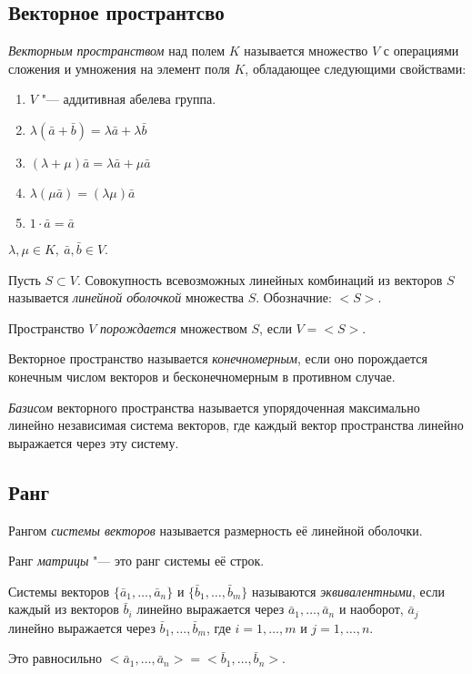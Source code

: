 \subsection*{Векторное пространтсво}

\begin{definition}
    \textit{Векторным пространством} над полем $K$ называется множество $V$ с операциями сложения и умножения на элемент поля $K$, обладающее следующими свойствами:
    \begin{enumerate}
        \item $V$ "--- аддитивная абелева группа.
    \item $\lambda(\bar{a} + \bar{b}) = \lambda \bar{a} + \lambda \bar{b}$
        \item $(\lambda + \mu)\bar{a} = \lambda \bar{a} + \mu \bar{a}$
        \item $\lambda(\mu \bar{a}) = (\lambda \mu)\bar{a}$
        \item $1 \cdot \bar{a} = \bar{a}$
    \end{enumerate}
    $\lambda,\mu \in K,~\bar{a},\bar{b} \in V$.
\end{definition}

\begin{definition}
    Пусть $S \subset V$. Совокупность всевозможных линейных комбинаций из векторов $S$ называется \textit{линейной оболочкой} множества $S$. Обозначние: $<\!S\!>$.
\end{definition}
Пространство $V$ \textit{порождается} множеством $S$, если $V = <\!S\!>$.

\begin{definition}
    Векторное пространство называется \textit{конечномерным}, если оно порождается конечным числом векторов и бесконечномерным в противном случае.
\end{definition}
\begin{definition}
    \textit{Базисом} векторного пространства называется упорядоченная максимально линейно независимая система векторов, где каждый вектор пространства линейно выражается через эту систему.    
\end{definition}

\subsection*{Ранг}
\begin{definition}
    Рангом \textit{системы векторов} называется размерность её линейной оболочки.

    Ранг \textit{матрицы} "--- это ранг системы её строк.
\end{definition}
\begin{definition}
    Системы векторов $\{\bar{a}_1, \ldots, \bar{a}_n\}$ и $\{\bar{b}_1, \ldots, \bar{b}_m\}$ называются \textit{эквивалентными}, если каждый из векторов $\bar{b}_i$ линейно выражается через $\bar{a}_1, \ldots, \bar{a}_n$ и наоборот,
    $\bar{a}_j$ линейно выражается через $\bar{b}_1, \ldots, \bar{b}_m$, где $i = 1,\ldots,m$ и $j = 1,\ldots, n$.

    Это равносильно $<\!\bar{a}_1, \ldots, \bar{a}_n\!> = <\!\bar{b}_1, \ldots, \bar{b}_n\!>$.
\end{definition}

